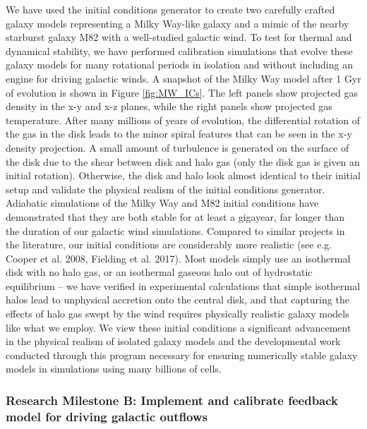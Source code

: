 \documentclass[11pt,letterpaper,english]{article}
\begin{document}
We have used the initial conditions generator to create two carefully crafted galaxy models representing
a Milky Way-like galaxy and a mimic of the nearby starburst galaxy M82 with a well-studied galactic wind.
To test for thermal and dynamical stability, we have performed calibration simulations that
evolve these galaxy models for many rotational periods in isolation and without including
an engine for driving galactic winds. 
A snapshot of the Milky Way model after 1 Gyr of evolution is shown in Figure \ref{fig:MW_ICs}. The left panels show projected gas density in the x-y and x-z planes, while the right panels show projected gas temperature. After many millions of years of evolution, the differential rotation of the gas in the disk leads to the minor spiral features that can be seen in the x-y density projection. A small amount of turbulence is generated on the surface of the disk due to the shear between disk and halo gas (only the disk gas is given an initial rotation). Otherwise, the disk and halo look almost identical to their initial setup and validate the physical realism of the initial conditions generator.
Adiabatic simulations of the Milky Way and M82 initial conditions have demonstrated that they are both stable for at least a gigayear, far longer than the duration of our galactic wind simulations. Compared to similar projects in the literature, our initial conditions are considerably more realistic (see e.g. Cooper et al. 2008, Fielding et al. 2017). Most models simply use an isothermal disk with no halo gas, or an isothermal gaseous 
halo out of hydrostatic equilibrium -- we have verified in experimental calculations that
simple isothermal halos lead to unphysical accretion onto the central disk, and that capturing the effects
of halo gas swept by the wind requires physically realistic galaxy models like what we employ. We view these
initial conditions a significant advancement in the physical realism of isolated galaxy models and the
developmental work conducted through this program necessary for ensuring numerically stable galaxy
models in simulations using many billions of cells.

\subsubsection{Research Milestone B: Implement and calibrate feedback model for driving galactic outflows}
\end{document}
